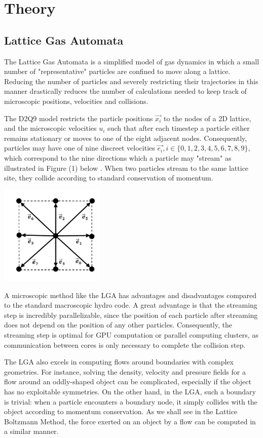 \documentclass[a4paper]{article}
\begin{document}
\section{Theory}

\subsection{Lattice Gas Automata}
The Lattice Gas Automata is a simplified model of gas dynamics in which a small number of "representative" particles are confined to move along a lattice. Reducing the number of particles and severely restricting their trajectories in this manner drastically reduces the number of calculations needed to keep track of microscopic positions, velocities and collisions.

The D2Q9 model restricts the particle positions $\vec{x_i}$ to the nodes of a 2D lattice, and the microscopic velocities $u_i$ such that after each timestep a particle either remains stationary or moves to one of the eight adjacent nodes. Consequently, particles may have one of nine discreet velocities $\vec{e_i}, i \in \{0, 1, 2, 3, 4, 5, 6, 7, 8, 9\}$, which correspond to the nine directions which a particle may "stream" as illustrated in Figure (1) below \cite{meskas}. When two particles stream to the same lattice site, they collide according to standard conservation of momentum.  

\includegraphics[width=5cm]{meskas_1.PNG}

A microscopic method like the LGA has advantages and disadvantages compared to the standard macroscopic hydro code. A great advantage is that the streaming step is incredibly parallelizable, since the position of each particle after streaming does not depend on the position of any other particles. Consequently, the streaming step is optimal for GPU computation or parallel computing clusters, as communication between cores is only necessary to complete the collision step. 

The LGA also excels in computing flows around boundaries with complex geometries. For instance, solving the density, velocity and pressure fields for a flow around an oddly-shaped object can be complicated, especially if the object has no exploitable symmetries. On the other hand, in the LGA, such a boundary is trivial: when a particle encounters a boundary node, it simply collides with the object according to momentum conservation. As we shall see in the Lattice Boltzmann Method, the force exerted on an object by a flow can be computed in a similar manner. 
\end{document}

